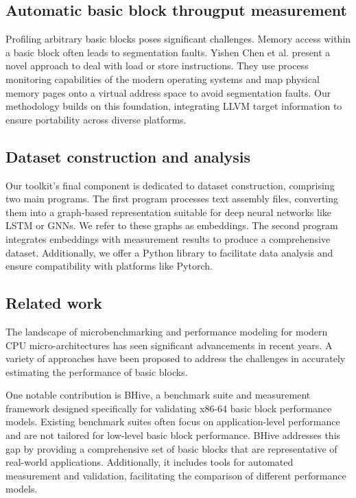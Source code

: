 \subsection{Automatic basic block througput measurement}

Profiling arbitrary basic blocks poses significant challenges. Memory access within a basic block often 
leads to segmentation faults. Yishen Chen et al. \cite{chenBHiveBenchmarkSuite2019} present a novel 
approach to deal with load or store instructions. They use process monitoring capabilities of the modern 
operating systems and map physical memory pages onto a virtual address space to avoid segmentation faults. 
Our methodology builds on this foundation, integrating LLVM target information to ensure portability 
across diverse platforms.

\subsection{Dataset construction and analysis}

Our toolkit's final component is dedicated to dataset construction, comprising two main programs. 
The first program processes text assembly files, converting them into a graph-based representation 
suitable for deep neural networks like LSTM or GNNs. We refer to these graphs as embeddings. 
The second program integrates embeddings with measurement results to produce a comprehensive dataset. 
Additionally, we offer a Python library to facilitate data analysis and ensure compatibility with 
platforms like Pytorch.

\subsection{Related work}

The landscape of microbenchmarking and performance modeling for modern CPU micro-architectures has 
seen significant advancements in recent years. A variety of approaches have been proposed to address 
the challenges in accurately estimating the performance of basic blocks.

One notable contribution is BHive, a benchmark suite and measurement framework designed specifically 
for validating x86-64 basic block performance models\cite{chenBHiveBenchmarkSuite2019}. Existing 
benchmark suites often focus on application-level performance and are not tailored for low-level 
basic block performance. BHive addresses this gap by providing a comprehensive set of basic blocks 
that are representative of real-world applications. Additionally, it includes tools for automated 
measurement and validation, facilitating the comparison of different performance models.

